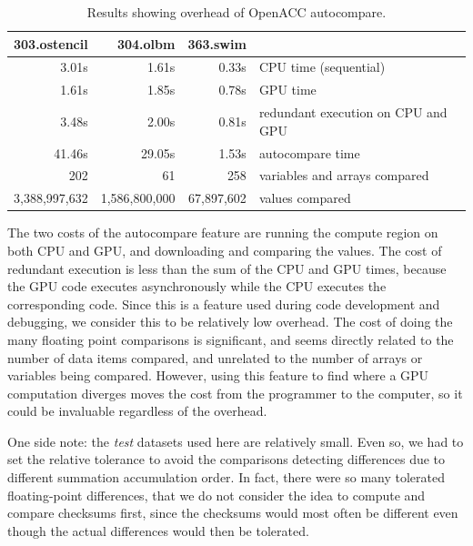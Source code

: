 \begin{table}
\begin{center}
\begin{tabular}{rrrl}
\hline
303.ostencil & 304.olbm & 363.swim & \\
\hline
 3.01s &  1.61s & 0.33s & CPU time (sequential) \\
 1.61s &  1.85s & 0.78s & GPU time \\
 3.48s &  2.00s & 0.81s & redundant execution on CPU and GPU \\
41.46s & 29.05s & 1.53s & autocompare time \\
202 & 61 & 258 & variables and arrays compared \\
3,388,997,632 & 1,586,800,000 & 67,897,602 & values compared \\
\hline
\end{tabular}
\end{center}
\caption{Results showing overhead of OpenACC autocompare.}
\label{res1}
\end{table}

The two costs of the autocompare feature are running the compute region on both CPU and GPU, and downloading and comparing the values.
The cost of redundant execution is less than the sum of the CPU and GPU times, because the GPU code executes asynchronously while the CPU executes the corresponding code.
Since this is a feature used during code development and debugging, we consider this to be relatively low overhead.
The cost of doing the many floating point comparisons is significant, and seems directly related to the number of data items compared, and unrelated to the number of arrays or variables being compared.
However, using this feature to find where a GPU computation diverges moves the cost from the programmer to the computer, so it could be invaluable regardless of the overhead.

One side note: the \emph{test} datasets used here are relatively small.
Even so, we had to set the relative tolerance to avoid the comparisons detecting differences due to different summation accumulation order.
In fact, there were so many tolerated floating-point differences, that we do not consider the idea to compute and compare checksums first, since the checksums would most often be different even though the actual differences would then be tolerated.
